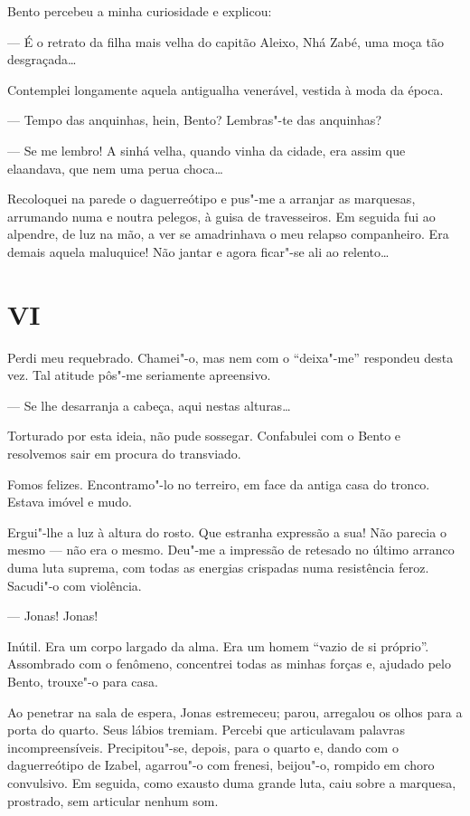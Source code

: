 Bento percebeu a minha curiosidade e explicou:

--- É o retrato da filha mais velha do capitão Aleixo, Nhá Zabé, uma
moça tão desgraçada\ldots{}

Contemplei longamente aquela antigualha venerável, vestida à moda da
época.

--- Tempo das anquinhas, hein, Bento? Lembras"-te das anquinhas?

--- Se me lembro! A sinhá velha, quando vinha da cidade, era assim que
elaandava, que nem uma perua choca\ldots{}

Recoloquei na parede o daguerreótipo e pus"-me a arranjar as marquesas,
arrumando numa e noutra pelegos, à guisa de travesseiros. Em seguida fui
ao alpendre, de luz na mão, a ver se amadrinhava o meu relapso
companheiro. Era demais aquela maluquice! Não jantar e agora ficar"-se
ali ao relento\ldots{}

\section*{VI}

Perdi meu requebrado. Chamei"-o, mas nem com o ``deixa"-me'' respondeu
desta vez. Tal atitude pôs"-me seriamente apreensivo.

--- Se lhe desarranja a cabeça, aqui nestas alturas\ldots{}

Torturado por esta ideia, não pude sossegar. Confabulei com o Bento e
resolvemos sair em procura do transviado.

Fomos felizes. Encontramo"-lo no terreiro, em face da antiga casa do
tronco. Estava imóvel e mudo.

Ergui"-lhe a luz à altura do rosto. Que estranha expressão a sua! Não
parecia o mesmo --- não era o mesmo. Deu"-me a impressão de retesado no
último arranco duma luta suprema, com todas as energias crispadas numa
resistência feroz. Sacudi"-o com violência.

--- Jonas! Jonas!

Inútil. Era um corpo largado da alma. Era um homem ``vazio de si
próprio''. Assombrado com o fenômeno, concentrei todas as minhas forças
e, ajudado pelo Bento, trouxe"-o para casa.

Ao penetrar na sala de espera, Jonas estremeceu; parou, arregalou os
olhos para a porta do quarto. Seus lábios tremiam. Percebi que
articulavam palavras incompreensíveis. Precipitou"-se, depois, para o
quarto e, dando com o daguerreótipo de Izabel, agarrou"-o com frenesi,
beijou"-o, rompido em choro convulsivo. Em seguida, como exausto duma
grande luta, caiu sobre a marquesa, prostrado, sem articular nenhum som.

